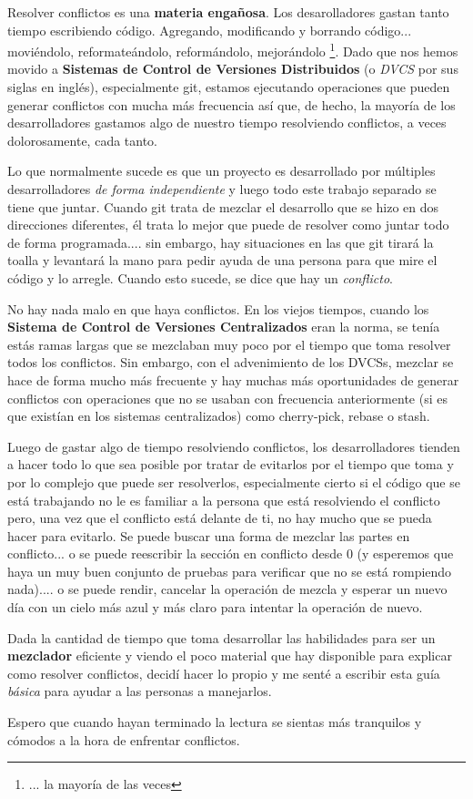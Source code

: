 Resolver conflictos es una {\bf materia engañosa}. Los desarolladores gastan tanto tiempo escribiendo código.
Agregando, modificando y borrando código... moviéndolo, reformateándolo, reformándolo, mejorándolo
\footnote{... la mayoría de las veces}. Dado que nos hemos movido a {\bf Sistemas de Control de Versiones Distribuidos}
(o {\it DVCS} por sus siglas en inglés), especialmente git, estamos ejecutando operaciones que pueden generar conflictos
con mucha más frecuencia así que, de hecho, la mayoría de los desarrolladores gastamos algo de nuestro tiempo resolviendo
conflictos, a veces dolorosamente, cada tanto.

Lo que normalmente sucede es que un proyecto es desarrollado por múltiples desarrolladores {\it de forma independiente}
y luego todo este trabajo separado se tiene que juntar. Cuando git trata de mezclar el desarrollo que se hizo en dos direcciones
diferentes, él trata lo mejor que puede de resolver como juntar todo de forma programada.... sin embargo, hay situaciones en las que
git tirará la toalla y levantará la mano para pedir ayuda de una persona para que mire el código y lo arregle. Cuando esto
sucede, se dice que hay un {\it conflicto}.

No hay nada malo en que haya conflictos. En los viejos tiempos, cuando los {\bf Sistema de Control de Versiones Centralizados} eran la
norma, se tenía estás ramas largas que se mezclaban muy poco por el tiempo que toma resolver todos los conflictos. Sin embargo, con el
advenimiento de los DVCSs, mezclar se hace de forma mucho más frecuente y hay muchas más oportunidades de generar conflictos con
operaciones que no se usaban con frecuencia anteriormente (si es que existían en los sistemas centralizados) como cherry-pick,
rebase o stash.

Luego de gastar algo de tiempo resolviendo conflictos, los desarrolladores tienden a hacer todo lo que sea posible por tratar de
evitarlos por el tiempo que toma y por lo complejo que puede ser resolverlos, especialmente cierto si el código que se está
trabajando no le es familiar a la persona que está resolviendo el conflicto pero, una vez que el conflicto está delante de
ti, no hay mucho que se pueda hacer para evitarlo. Se puede buscar una forma de mezclar las partes en conflicto... o se puede
reescribir la sección en conflicto desde 0 (y esperemos que haya un muy buen conjunto de pruebas para verificar que no se está rompiendo
nada).... o se puede rendir, cancelar la operación de mezcla y esperar un nuevo día con un cielo más azul y más claro para intentar
la operación de nuevo.

Dada la cantidad de tiempo que toma desarrollar las habilidades para ser un {\bf mezclador} eficiente y viendo el poco material
que hay disponible para explicar como resolver conflictos, decidí hacer lo propio y me senté a escribir esta guía
{\it básica} para ayudar a las personas a manejarlos.

Espero que cuando hayan terminado la lectura se sientas más tranquilos y cómodos a la hora de enfrentar conflictos.


